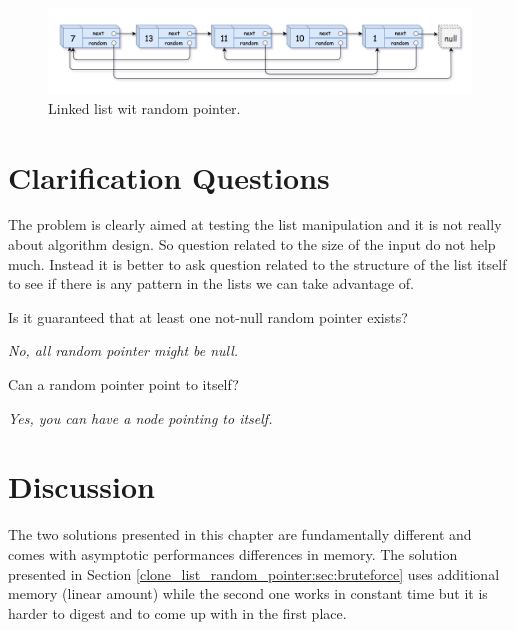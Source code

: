 \begin{figure}
	\label{fig:clone_list_random_pointer:list1}
	\centering
	\includegraphics[scale=0.2]{sources/clone_list_random_pointer/images/random_list1}
	\caption{Linked list wit random pointer.}
\end{figure}


\section{Clarification Questions}
The problem is clearly aimed at testing the list manipulation and it is not really about algorithm design. So question related to the size of the input do not help much. Instead it is better to ask question related to the structure of the list itself to see if there is any pattern in the lists we can take advantage of.
\begin{QandA}
	\item Is it guaranteed that at least one not-null random pointer exists?
	\begin{answered}
		\textit{No, all random pointer might be null.}
	\end{answered}
	\item Can a random pointer point to itself?
	\begin{answered}
		\textit{Yes, you can have a node pointing to itself.}
	\end{answered}
	
\end{QandA}

\section{Discussion}
\label{clone_list_random_pointer:sec:discussion}
The two solutions presented in this chapter are fundamentally different and comes with asymptotic performances differences in memory.
The solution presented in Section \ref{clone_list_random_pointer:sec:bruteforce} uses additional memory (linear amount) while the second one works in constant time but it is harder to digest and to come up with in the first place.

